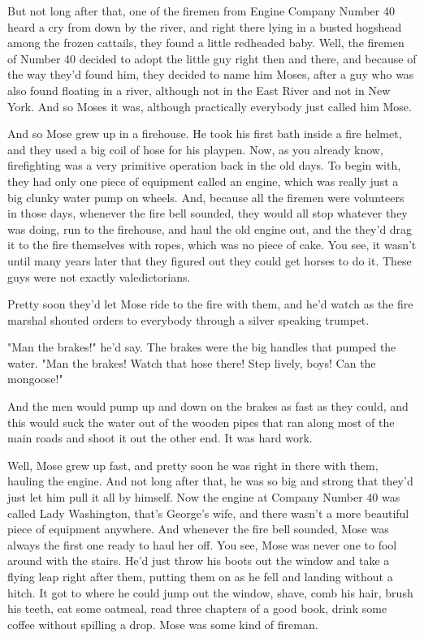 But not long after that, one of the firemen from Engine Company Number 40 heard a cry from down by the river, and right there lying in a busted hogshead among the frozen cattails, they found a little redheaded baby. Well, the firemen of Number 40 decided to adopt the little guy right then and there, and because of the way they'd found him, they decided to name him Moses, after a guy who was also found floating in a river, although not in the East River and not in New York. And so Moses it was, although practically everybody just called him Mose.

And so Mose grew up in a firehouse. He took his first bath inside a fire helmet, and they used a big coil of hose for his playpen. Now, as you already know, firefighting was a very primitive operation back in the old days. To begin with, they had only one piece of equipment called an engine, which was really just a big clunky water pump on wheels. And, because all the firemen were volunteers in those days, whenever the fire bell sounded, they would all stop whatever they was doing, run to the firehouse, and haul the old engine out, and the they'd drag it to the fire themselves with ropes, which was no piece of cake. You see, it wasn't until many years later that they figured out they could get horses to do it. These guys were not exactly valedictorians.

Pretty soon they'd let Mose ride to the fire with them, and he'd watch as the fire marshal shouted orders to everybody through a silver speaking trumpet.

"Man the brakes!" he'd say. The brakes were the big handles that pumped the water. "Man the brakes! Watch that hose there! Step lively, boys! Can the mongoose!"

And the men would pump up and down on the brakes as fast as they could, and this would suck the water out of the wooden pipes that ran along most of the main roads and shoot it out the other end. It was hard work.

Well, Mose grew up fast, and pretty soon he was right in there with them, hauling the engine. And not long after that, he was so big and strong that they'd just let him pull it all by himself. Now the engine at Company Number 40 was called Lady Washington, that's George's wife, and there wasn't a more beautiful piece of equipment anywhere. And whenever the fire bell sounded, Mose was always the first one ready to haul her off. You see, Mose was never one to fool around with the stairs. He'd just throw his boots out the window and take a flying leap right after them, putting them on as he fell and landing without a hitch. It got to where he could jump out the window, shave, comb his hair, brush his teeth, eat some oatmeal, read three chapters of a good book, drink some coffee without spilling a drop. Mose was some kind of fireman.

